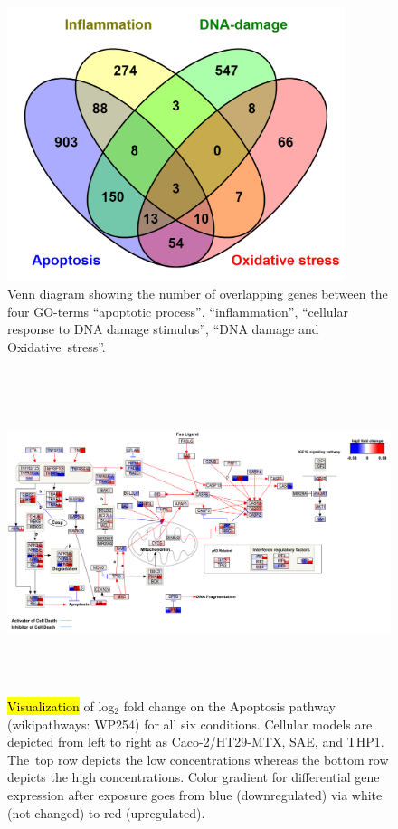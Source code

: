 \documentclass[ijms,article,accept,moreauthors,pdftex]{Definitions/mdpi}
\begin{document}
\begin{paracol}{2}
\begin{figure}[H]
\includegraphics[height=8cm,keepaspectratio]{figA1.png}
\caption{Venn diagram showing the number of overlapping genes between the four GO-terms “apoptotic process”, “inflammation”, “cellular response to DNA damage stimulus”, “DNA damage and Oxidative~stress”.
}
\label{fig:figA1}
\end{figure}
\vspace{-12pt}

\end{paracol}
\nointerlineskip
\renewcommand{\thefigure}{A\arabic{figure}}
\begin{figure}[H]
\widefigure
\includegraphics[height=9.5cm,keepaspectratio]{figA2.png}
\caption{\hl{Visualization} of log$_{2}$ fold change on the Apoptosis pathway (wikipathways: WP254) for all six conditions.
{Cellular models} are depicted from left to right as {Caco-2/HT29-MTX}, SAE, and THP1. The~top row depicts the low concentrations whereas the bottom row depicts the high concentrations. {Color gradient for differential gene expression after exposure goes from blue (downregulated) via white (not changed) to red (upregulated).}
}
\label{fig:figA2}
\end{figure}
\end{document}
